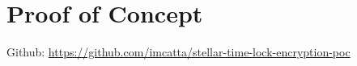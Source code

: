 \chapter{Proof of Concept}




Github: 
\url{https://github.com/imcatta/stellar-time-lock-encryption-poc}